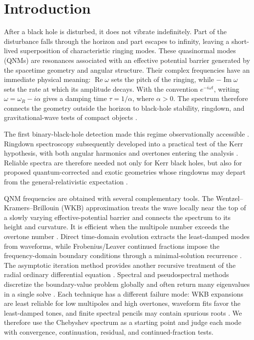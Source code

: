 \documentclass[12pt,a4paper]{article}
\begin{document}
\section{Introduction}

After a black hole is disturbed, it does not vibrate indefinitely.  Part of
the disturbance falls through the horizon and part escapes to infinity,
leaving a short-lived superposition of characteristic ringing modes.  These
quasinormal modes (QNMs) are resonances associated with an effective potential
barrier generated by the spacetime geometry and angular structure.  Their
complex frequencies have an immediate physical meaning:
\(\operatorname{Re}\omega\) sets the pitch of the ringing, while
\(-\operatorname{Im}\omega\) sets the rate at which its amplitude decays.
With the convention \(e^{-i\omega t}\), writing
\(\omega=\omega_R-i\alpha\) gives a damping time
\(\tau=1/\alpha\), where \(\alpha>0\).
The spectrum therefore connects the geometry outside the horizon to black-hole
stability, ringdown, and gravitational-wave tests of compact objects
\cite{Vishveshwara1970,Kokkotas1999,Berti2009,Konoplya2011}.

The first binary-black-hole detection made this regime observationally
accessible \cite{Abbott2016Observation}. Ringdown spectroscopy subsequently
developed into a practical test of the Kerr hypothesis, with both angular
harmonics and overtones entering the analysis \cite{Berti2006,Berti2009,Isi2019}.
Reliable spectra are therefore needed not only for Kerr black holes, but also
for proposed quantum-corrected and exotic geometries whose ringdowns may depart
from the general-relativistic expectation \cite{Konoplya2011,Jaramillo2021}.

QNM frequencies are obtained with several complementary tools.  The
Wentzel--Kramers--Brillouin (WKB) approximation treats the wave locally near
the top of a slowly varying effective-potential barrier and connects the
spectrum to its height and curvature.  It is efficient when the multipole number exceeds
the overtone number \cite{Schutz1985,Iyer1987,Ferrari1984,Konoplya2003,Konoplya2011}. Direct
time-domain evolution extracts the least-damped modes from waveforms, while
Frobenius/Leaver continued fractions impose the frequency-domain boundary
conditions through a minimal-solution recurrence \cite{Leaver1985,Nollert1993}. The
asymptotic iteration method provides another recursive treatment of the radial
ordinary differential equation \cite{Cho2010}.  Spectral and pseudospectral
methods discretize the boundary-value problem globally and often return many
eigenvalues in a single solve \cite{Jansen2017}. Each technique has a different
failure mode: WKB expansions are least reliable for low multipoles and high
overtones, waveform fits favor the least-damped tones, and finite spectral
pencils may contain spurious roots \cite{Konoplya2003,Konoplya2011,Jansen2017}.
We therefore use the Chebyshev spectrum as a starting point and judge each mode
with convergence, continuation, residual, and continued-fraction tests.
\end{document}
